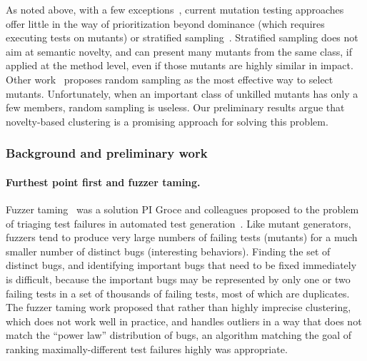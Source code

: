 As noted above, with a few exceptions~\cite{MutGoogle,FaRM,MutQuality}, current mutation testing approaches
offer little in the way of prioritization beyond dominance (which
requires executing tests on mutants) or stratified sampling~\cite{gopinath2017mutation,MutQuality}.
Stratified sampling does not aim at semantic novelty, and can present many
mutants from the same class, if applied at the method level, even if those
mutants are highly similar in impact.  Other work~\cite{gopinath2015howhard}
proposes random sampling as the most effective way to select mutants.
Unfortunately, when an important class of unkilled mutants has only a few
members, random sampling is useless.
Our preliminary results argue that novelty-based clustering is a
promising approach for solving this problem.

\subsubsection{Background and preliminary work}


\paragraph{Furthest point first and fuzzer taming.} Fuzzer taming~\cite{PLDI13}
was a solution PI Groce and colleagues proposed to the problem
of triaging test failures in automated test generation~\cite{SemCrash}.
Like mutant generators, fuzzers tend to produce very large numbers of failing
tests (mutants) for a much
smaller number of distinct bugs (interesting behaviors).  Finding the set of distinct bugs,
and identifying important bugs that need to be fixed immediately is
difficult, because the important bugs may be represented by only one
or two failing tests in a set of thousands of failing tests, most of
which are duplicates.  The fuzzer taming work proposed that rather than highly imprecise
clustering, which does not work well in practice, and handles outliers
in a way that does not match the ``power law'' distribution of bugs, an
algorithm matching the goal of ranking maximally-different test
failures highly was appropriate.

